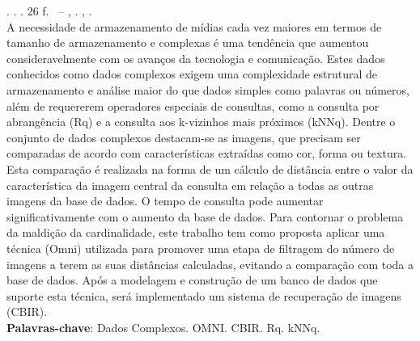 
\begin{resumo}[RESUMO]
\begin{SingleSpacing}
    
\imprimirautorcitacao. \imprimirtitulo. \imprimirdata. 26 f. \imprimirprojeto\ – \imprimirprograma, \imprimirinstituicao. \imprimirlocal, \imprimirdata.\\ 
					
A necessidade de armazenamento de mídias cada vez maiores em termos de tamanho de armazenamento e complexas é uma tendência que aumentou consideravelmente
com os avanços da tecnologia e comunicação. Estes dados conhecidos como dados complexos exigem uma complexidade estrutural
de armazenamento e análise maior do que dados simples como palavras ou números, além de requererem operadores especiais
de consultas, como a consulta por abrangência (Rq) e a consulta aos k-vizinhos mais próximos (kNNq). Dentre o conjunto de dados complexos
destacam-se as imagens, que precisam ser comparadas de acordo com características extraídas como cor, forma ou textura. Esta
comparação é realizada na forma de um cálculo de distância entre o valor da característica da imagem central da consulta em relação
a todas as outras imagens da base de dados. O tempo de consulta pode aumentar significativamente com o aumento da base de dados. 
Para contornar o problema da maldição da cardinalidade, este trabalho tem como proposta aplicar uma técnica (Omni) utilizada para promover 
uma etapa de filtragem do número de imagens a terem as suas distâncias calculadas, evitando a comparação com toda a base de dados.
Após a modelagem e construção de um banco de dados que suporte esta técnica, será implementado um sistema de recuperação de imagens
(CBIR).\\

\textbf{Palavras-chave}: Dados Complexos. OMNI. CBIR. Rq. kNNq.

\end{SingleSpacing}
\end{resumo}


